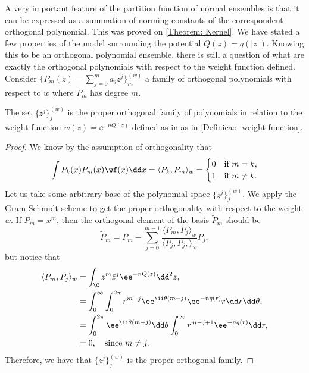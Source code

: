 A very important feature of the partition function of normal ensembles is that it can be expressed as a summation of norming constants of the correspondent orthogonal polynomial. This was proved on \autoref{Theorem: Kernel}. We have stated a few properties of the model surrounding the potential $Q(z) = q(|z|)$. Knowing this to be an orthogonal polynomial ensemble, there is still a question of what are exactly the orthogonal polynomials with respect to the weight function defined. Consider $\{P_m(z) = \sum_{j=0}^{m} a_j z^j\}_{m}^{(w)}$ a family of orthogonal polynomials with respect to $w$ where $P_m$ has degree $m$. 

\begin{lema}
	The set $\{z^j\}_j^{(w)}$ is the proper orthogonal family of polynomials in relation to the weight function $w(z) = \ee^{-n Q(z)}$ defined as in as in \autoref{Definicao: weight-function}.
\end{lema}
\begin{proof}
	We know by the assumption of orthogonality that
	\begin{equation}
		\int P_k(x) P_m(x) \wf(x) \dd x = \langle P_k, P_m \rangle_w = 
		\begin{cases}
			0 & \text{if $m = k$}, \\
			1 & \text{if $m \neq k$}.
		\end{cases}
	\end{equation} 
	Let us take some arbitrary base of the polynomial space $\{z^j\}_j^{(w)}$. We apply the Gram Schmidt scheme to get the proper orthogonality with respect to the weight $w$. If $P_m = x^m$, then the orthogonal element of the basis $\tilde{P}_m$ should be
	\begin{equation}
		\tilde{P}_m = P_m - \sum_{j=0}^{m-1} \frac{\langle P_m, P_{j} \rangle_w}{\langle P_{j}, P_{j}, \rangle_w} P_{j},
	\end{equation}
	but notice that
	\begin{align}
		\langle P_m, P_{j} \rangle_w & = \int_{\C} z^{m}\bar{z}^{j} \ee^{-n Q(z)} \dd^2 z, \\
		& = \int_{0}^{\infty} \int_{0}^{2\pi} r^{m-j} \ee^{\ii \theta (m- j)} \ee^{-n q(r)} r \dd r \dd \theta, \\
		& = \int_{0}^{2\pi} \ee^{\ii \theta (m - j)} \dd \theta \int_{0}^{\infty} r^{m-j+1} \ee^{-n q(r)} \dd r, \\
		& = 0, \quad \text{since} \  m \neq j.
	\end{align}
	Therefore, we have that $\{z^j\}_j^{(w)}$ is the proper orthogonal family. 
\end{proof}

